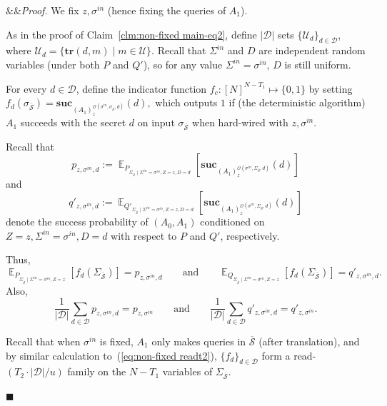 \documentclass[11pt]{article}
\renewenvironment{proof}[1][]
    {\noindent
       \ifx&#1&{\it Proof.}
       \else{\it Proof ({#1}).}
       \fi}{\hfill $\blacksquare$}
\DeclareMathOperator*{\E}{\mathbb{E}}
\newcommand{\SECS}{{\mathcal{D}}}
\newcommand{\secv}{{d}}
\newcommand{\SECV}{{D}}
\newcommand{\SUC}{\boldsymbol{suc}}
\newcommand{\TR}{\boldsymbol{tr}}
\begin{document}
\begin{proof}
We fix $z,\sigma^{in}$ (hence fixing the queries of $A_1$). 

As in the proof of Claim~\ref{clm:non-fixed main-eq2}, 
define $|\SECS|$ sets $\{\mathcal{U}_\secv\}_{\secv \in \SECS }$,
where $\mathcal{U}_\secv = \{ \TR(\secv,m) \mid m \in \mathcal{U}\}$.
Recall that $\Sigma^{in}$ and $\SECV$ are independent random variables (under both $P$ and $Q'$),
so for any value $\Sigma^{in} = \sigma^{in}$, $\SECV$ is still uniform.


For every $\secv \in \SECS$, define the indicator function $f_c:[N]^{N - T_1} \mapsto \{0,1\}$ by setting
$f_\secv(\sigma_{\overline{\mathcal{S}}}) = 
\SUC_{(A_1)_{z}^{\mathcal{O}(\sigma^{in} , \sigma_{\overline{\mathcal{S}}},\secv)}}(\secv),
$
which outputs $1$ if
(the deterministic algorithm) $A_1$ succeeds with the secret $\secv$ on input $\sigma_{\overline{\mathcal{S}}}$ when hard-wired with $z,\sigma^{in}$. 

Recall that
$$p_{z,\sigma^{in},\secv} := 
\E_{P_{ \Sigma_{\overline{\mathcal{S}}} \mid \Sigma^{in} = \sigma^{in}, Z=z, \SECV = \secv}}
[ 
\SUC_{(A_1)_{z}^{\mathcal{O}( \sigma^{in} , \Sigma_{\overline{\mathcal{S}}},\secv)}}(\secv)
]$$ 
and
$$q'_{z,\sigma^{in},\secv} := \E_{Q'_{ \Sigma_{\overline{\mathcal{S}}} \mid \Sigma^{in} = \sigma^{in}, Z=z, \SECV = \secv}} [
\SUC_{(A_1)_{z}^{\mathcal{O}(\sigma^{in}, \Sigma_{\overline{\mathcal{S}}},\secv)}}(\secv)
]$$ 
denote the success probability of $(A_0,A_1)$ conditioned on $Z=z,\Sigma^{in} = \sigma^{in}, \SECV = \secv$ with respect to $P$ and $Q'$, respectively.

Thus,
$$ 
\E_{   P_{\Sigma_{\overline{\mathcal{S}}} \mid \Sigma^{in} = \sigma^{in} ,Z = z} } [f_d(\Sigma_{\overline{\mathcal{S}}})] 
= 
p_{z,\sigma^{in},\secv}
\qquad \mbox{and} \qquad
\E_{ Q_{\Sigma_{\overline{\mathcal{S}}} \mid \Sigma^{in} = \sigma^{in} ,Z = z}} 
[f_d(\Sigma_{\overline{\mathcal{S}}})] 
= 
q'_{z,\sigma^{in},\secv}.
$$
Also,
$$ 
\frac{1}{|\SECS|} \sum_{\secv \in \SECS} 
p_{z,\sigma^{in},\secv}
= 
p_{z,\sigma^{in}}
\qquad \mbox{and} \qquad 
\frac{1}{|\SECS|} \sum_{\secv \in \SECS} 
q'_{z,\sigma^{in},\secv}
= 
q'_{z,\sigma^{in} }.
$$

Recall that when $\sigma^{in}$ is fixed, $A_1$ only makes queries in
$\overline{\mathcal{S}}$ (after translation), and by similar calculation to~(\ref{eq:non-fixed readt2}),
$\{ f_\secv \}_{\secv \in \SECS}$ form a read-$(T_2 \cdot |\SECS|/u)$ family on the $N - T_1$ variables of $\Sigma_{\overline{\mathcal{S}}}$. 


\end{proof}
\end{document}
